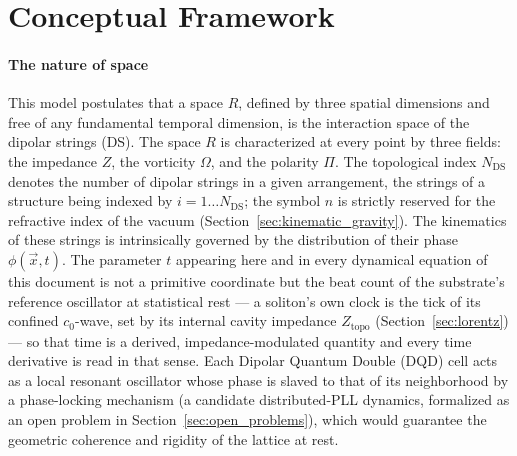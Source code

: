 \documentclass[11pt,a4paper]{article}
\theoremstyle{plain}
\theoremstyle{remark}
\newcommand{\Ncd}{\ensuremath{N_{\mathrm{DS}}}}
\begin{document}
\section{Conceptual Framework}
\label{sec:conceptual}

\paragraph{The nature of space}
This model postulates that a space $R$, defined by three spatial dimensions and free of any fundamental temporal dimension, is the interaction space of the dipolar strings (DS). The space $R$ is characterized at every point by three fields: the impedance $Z$, the vorticity $\Omega$, and the polarity $\Pi$. The topological index $\Ncd$ denotes the number of dipolar strings in a given arrangement, the strings of a structure being indexed by $i = 1 \ldots \Ncd$; the symbol $n$ is strictly reserved for the refractive index of the vacuum (Section~\ref{sec:kinematic_gravity}). The kinematics of these strings is intrinsically governed by the distribution of their phase $\phi(\vec{x},t)$. The parameter $t$ appearing here and in every dynamical equation of this document is not a primitive coordinate but the beat count of the substrate's reference oscillator at statistical rest --- a soliton's own clock is the tick of its confined $c_0$-wave, set by its internal cavity impedance $Z_{\text{topo}}$ (Section~\ref{sec:lorentz}) --- so that time is a derived, impedance-modulated quantity and every time derivative is read in that sense. Each Dipolar Quantum Double (DQD) cell acts as a local resonant oscillator whose phase is slaved to that of its neighborhood by a phase-locking mechanism (a candidate distributed-PLL dynamics, formalized as an open problem in Section~\ref{sec:open_problems}), which would guarantee the geometric coherence and rigidity of the lattice at rest.
\end{document}
